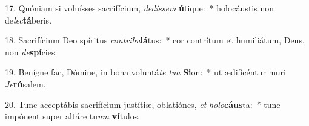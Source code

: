 17. Quóniam si voluísses sacrifícium, \textit{de}\textit{dís}\textit{sem} \textbf{ú}tique:~*  holocáustis non de\textit{lec}\textbf{tá}beris.\

18. Sacrifícium Deo spíritus \textit{con}\textit{tri}\textit{bu}\textbf{lá}tus:~*  cor contrítum et humiliátum, Deus, non \textit{de}\textbf{spí}cies.\

19. Benígne fac, Dómine, in bona voluntá\textit{te} \textit{tu}\textit{a} \textbf{Si}on:~*  ut ædificéntur muri \textit{Je}\textbf{rú}salem.\

20. Tunc acceptábis sacrifícium justítiæ, oblatiónes, \textit{et} \textit{ho}\textit{lo}\textbf{cáus}ta:~*  tunc impónent super altáre tu\textit{um} \textbf{ví}tulos.\

